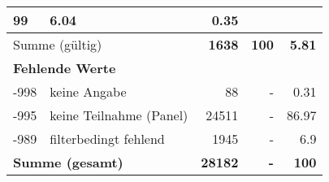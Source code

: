 \begin{longtable}{lXrrr}
       \num{99} &
       \num[round-mode=places,round-precision=2]{6.04} &
         \num[round-mode=places,round-precision=2]{0.35} \\
     \midrule
     \multicolumn{2}{l}{Summe (gültig)} &
       \textbf{\num{1638}} &
     \textbf{\num{100}} &
       \textbf{\num[round-mode=places,round-precision=2]{5.81}} \\
     \multicolumn{5}{l}{\textbf{Fehlende Werte}}\\
       -998 &
       keine Angabe &
         \num{88} &
        - &
         \num[round-mode=places,round-precision=2]{0.31} \\
       -995 &
       keine Teilnahme (Panel) &
         \num{24511} &
        - &
         \num[round-mode=places,round-precision=2]{86.97} \\
       -989 &
       filterbedingt fehlend &
         \num{1945} &
        - &
         \num[round-mode=places,round-precision=2]{6.9} \\
     \midrule
     \multicolumn{2}{l}{\textbf{Summe (gesamt)}} &
          \textbf{\num{28182}} &
        \textbf{-} &
        \textbf{\num{100}} \\
     \bottomrule
     \end{longtable}
     
